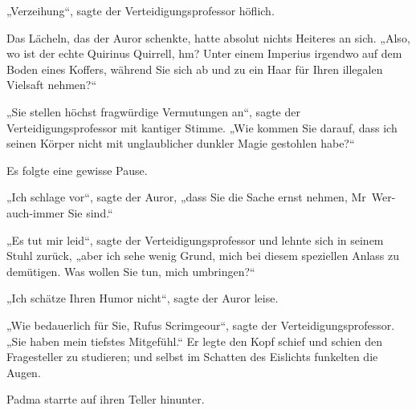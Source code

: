 „Verzeihung“, sagte der Verteidigungsprofessor höflich.

Das Lächeln, das der Auror schenkte, hatte absolut nichts Heiteres an sich.
„Also, wo ist der echte Quirinus Quirrell, hm? Unter einem Imperius irgendwo auf dem Boden eines Koffers, während Sie sich ab und zu ein Haar für Ihren illegalen Vielsaft nehmen?“

„Sie stellen höchst fragwürdige Vermutungen an“, sagte der Verteidigungsprofessor mit kantiger Stimme. „Wie kommen Sie darauf, dass ich seinen Körper nicht mit unglaublicher dunkler Magie gestohlen habe?“

Es folgte eine gewisse Pause.

„Ich schlage vor“, sagte der Auror, „dass Sie die Sache ernst nehmen, Mr~Wer-auch-immer Sie sind.“

„Es tut mir leid“, sagte der Verteidigungsprofessor und lehnte sich in seinem Stuhl zurück, „aber ich sehe wenig Grund, mich bei diesem speziellen Anlass zu demütigen. Was wollen Sie tun, mich umbringen?“

„Ich schätze Ihren Humor nicht“, sagte der Auror leise.

„Wie bedauerlich für Sie, Rufus Scrimgeour“, sagte der Verteidigungsprofessor. „Sie haben mein tiefstes Mitgefühl.“ Er legte den Kopf schief und schien den Fragesteller zu studieren; und selbst im Schatten des Eislichts funkelten die Augen.

\later

Padma starrte auf ihren Teller hinunter.

